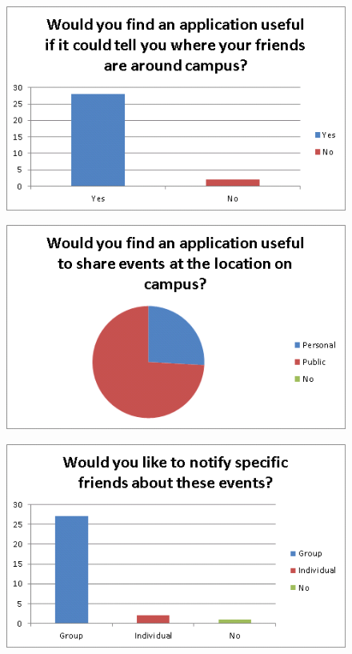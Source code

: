 \documentclass[10pt,oneside,notitlepage]{report}
\begin{document}
\begin{figure}[H]
 \centering
 \includegraphics[keepaspectratio]{7.png}
\end{figure}

\begin{figure}[H]
 \centering
 \includegraphics[keepaspectratio]{8.png}
\end{figure}

\begin{figure}[H]
 \centering
 \includegraphics[keepaspectratio]{9.png}
\end{figure}
\end{document}
